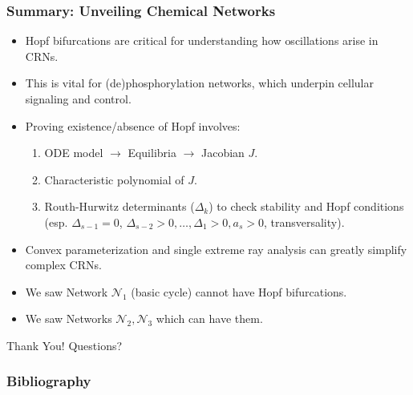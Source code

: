 \documentclass[aspectratio=169]{beamer}
\begin{document}
\begin{frame}{\insertsectionhead}
\frametitle{Summary: Unveiling Chemical Networks}
\begin{itemize}
	\item Hopf bifurcations are critical for understanding how \alert{oscillations} arise in CRNs.
	\item This is vital for (de)phosphorylation networks, which underpin cellular signaling and control.
	\item Proving existence/absence of Hopf involves:
		\begin{enumerate}
			\item ODE model $\to$ Equilibria $\to$ Jacobian $J$.
			\item Characteristic polynomial of $J$.
			\item Routh-Hurwitz determinants ($\Delta_k$) to check stability and Hopf conditions (esp. $\Delta_{s-1}=0$, $\Delta_{s-2}>0, \dots, \Delta_1>0, a_s>0$, transversality).
		\end{enumerate}
	\item \alert{Convex parameterization} and \alert{single extreme ray} analysis can greatly simplify complex CRNs.
	\item We saw Network $\mathcal{N}_1$ (basic cycle) \alert{cannot} have Hopf bifurcations.
	\item We saw Networks $\mathcal{N}_2, \mathcal{N}_3$ which \alert{can} have them.
\end{itemize}
\end{frame}

\begin{frame}[plain]
\centering
\vfill
\Huge Thank You!
\vfill
Questions? \\
\vfill
\end{frame}

\begin{frame}
\frametitle{Bibliography}
\printbibliography
\end{frame}
\end{document}
